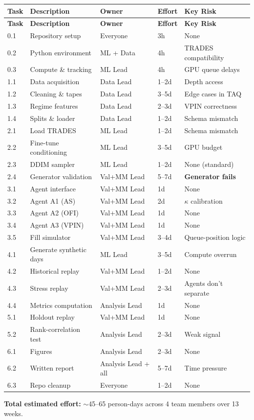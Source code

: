 \documentclass[11pt,a4paper]{article}
\begin{document}
\begin{center}
\small
\begin{longtable}{p{0.6cm}p{4.5cm}p{2.5cm}p{1.5cm}p{3.5cm}}
\toprule
\textbf{Task} & \textbf{Description} & \textbf{Owner} & \textbf{Effort} & \textbf{Key Risk} \\
\midrule
\endfirsthead
\toprule
\textbf{Task} & \textbf{Description} & \textbf{Owner} & \textbf{Effort} & \textbf{Key Risk} \\
\midrule
\endhead
0.1 & Repository setup & Everyone & 3h & None \\
0.2 & Python environment & ML + Data & 4h & TRADES compatibility \\
0.3 & Compute \& tracking & ML Lead & 4h & GPU queue delays \\
\midrule
1.1 & Data acquisition & Data Lead & 1--2d & Depth access \\
1.2 & Cleaning \& tapes & Data Lead & 3--5d & Edge cases in TAQ \\
1.3 & Regime features & Data Lead & 2--3d & VPIN correctness \\
1.4 & Splits \& loader & Data Lead & 1--2d & Schema mismatch \\
\midrule
2.1 & Load TRADES & ML Lead & 1--2d & Schema mismatch \\
2.2 & Fine-tune conditioning & ML Lead & 3--5d & GPU budget \\
2.3 & DDIM sampler & ML Lead & 1--2d & None (standard) \\
2.4 & Generator validation & Val+MM Lead & 5--7d & \textbf{Generator fails} \\
\midrule
3.1 & Agent interface & Val+MM Lead & 1d & None \\
3.2 & Agent A1 (AS) & Val+MM Lead & 2d & $\kappa$ calibration \\
3.3 & Agent A2 (OFI) & Val+MM Lead & 1d & None \\
3.4 & Agent A3 (VPIN) & Val+MM Lead & 1d & None \\
3.5 & Fill simulator & Val+MM Lead & 3--4d & Queue-position logic \\
\midrule
4.1 & Generate synthetic days & ML Lead & 3--5d & Compute overrun \\
4.2 & Historical replay & Val+MM Lead & 1--2d & None \\
4.3 & Stress replay & Val+MM Lead & 2--3d & Agents don't separate \\
4.4 & Metrics computation & Analysis Lead & 1d & None \\
\midrule
5.1 & Holdout replay & Val+MM Lead & 1d & None \\
5.2 & Rank-correlation test & Analysis Lead & 2--3d & Weak signal \\
\midrule
6.1 & Figures & Analysis Lead & 2--3d & None \\
6.2 & Written report & Analysis Lead + all & 5--7d & Time pressure \\
6.3 & Repo cleanup & Everyone & 1--2d & None \\
\bottomrule
\end{longtable}
\end{center}

\vspace{0.3cm}
\textbf{Total estimated effort:} $\sim$45--65 person-days across 4 team members over 13 weeks.
\end{document}

